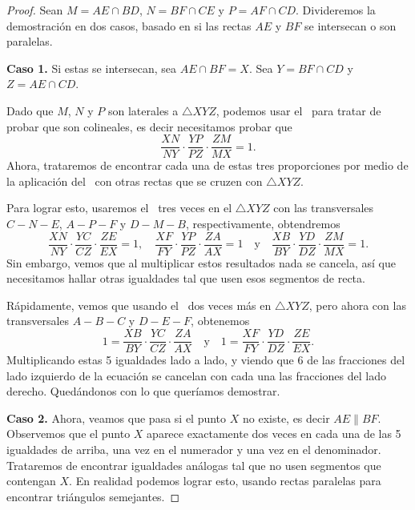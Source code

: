 \begin{proof}
    Sean $M = AE \cap BD$, $N = BF \cap CE$ y $P = AF \cap CD$.
    Divideremos la demostración en dos casos, basado en si las rectas $AE$ y $BF$ se intersecan o son paralelas.
    
    \textbf{Caso 1.}
    Si estas se intersecan, sea $AE \cap BF = X$.
    Sea $Y = BF \cap CD$ y $Z = AE \cap CD$.

    \begin{multicols}{2}
        \begin{figure}[H]
            \centering
            
        \end{figure}

        Dado que $M$, $N$ y $P$ son laterales a $\triangle XYZ$, podemos usar el~ para tratar de probar que son colineales, es decir necesitamos probar que
        \[
            \frac{XN}{NY} \cdot \frac{YP}{PZ} \cdot \frac{ZM}{MX} = 1.
        \]
        Ahora, trataremos de encontrar cada una de estas tres proporciones por medio de la aplicación del~ con otras rectas que se cruzen con $\triangle XYZ$.
    \end{multicols}

    Para lograr esto, usaremos el~ tres veces en el $\triangle XYZ$ con las transversales $C - N - E$, $A - P - F$ y $D - M - B$, respectivamente, obtendremos
    \[
        \frac{XN}{NY} \cdot \frac{YC}{CZ} \cdot \frac{ZE}{EX} = 1, \quad \frac{XF}{FY} \cdot \frac{YP}{PZ} \cdot \frac{ZA}{AX} = 1 \quad \text{y} \quad \frac{XB}{BY} \cdot \frac{YD}{DZ} \cdot \frac{ZM}{MX} = 1.
    \]
    Sin embargo, vemos que al multiplicar estos resultados nada se cancela, así que necesitamos hallar otras igualdades tal que usen esos segmentos de recta.

    Rápidamente, vemos que usando el~ dos veces más en $\triangle XYZ$, pero ahora con las transversales $A - B - C$ y $D - E - F$, obtenemos
    \[
        1 = \frac{XB}{BY} \cdot \frac{YC}{CZ} \cdot \frac{ZA}{AX} \quad \text{y} \quad 1 = \frac{XF}{FY} \cdot \frac{YD}{DZ} \cdot \frac{ZE}{EX}.
    \]
    Multiplicando estas 5 igualdades lado a lado, y viendo que 6 de las fracciones del lado izquierdo de la ecuación se cancelan con cada una las fracciones del lado derecho.
    Quedándonos con lo que queríamos demostrar.

    \textbf{Caso 2.}
    Ahora, veamos que pasa si el punto $X$ no existe, es decir $AE \parallel BF$.
    Observemos que el punto $X$ aparece exactamente dos veces en cada una de las 5 igualdades de arriba, una vez en el numerador y una vez en el denominador.
    Trataremos de encontrar igualdades análogas tal que no usen segmentos que contengan $X$.
    En realidad podemos lograr esto, usando rectas paralelas para encontrar triángulos semejantes.


\end{proof}
